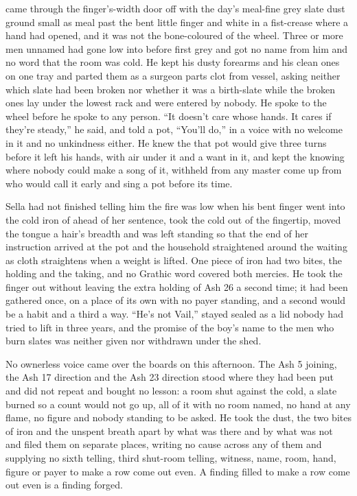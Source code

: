  came through the finger's-width door off  with the day's meal-fine grey slate dust ground small as meal past the bent little finger and white in a fist-crease where a hand had opened, and it was not the bone-coloured  of the wheel. Three or more men unnamed had gone low into  before first grey and got no name from him and no word that the room was cold. He kept his dusty forearms and his clean ones on one tray and parted them as a surgeon parts clot from vessel, asking neither which slate had been broken nor whether it was a birth-slate while the broken ones lay under the lowest rack and were entered by nobody. He spoke to the wheel before he spoke to any person. “It doesn't care whose hands. It cares if they're steady,” he said, and told a pot, “You'll do,” in a voice with no welcome in it and no unkindness either. He knew the  that pot would give three turns before it left his hands, with air under it and a want in it, and kept the knowing where nobody could make a song of it, withheld from any master come up from  who would call it early and sing a pot before its time.

Sella had not finished telling him the fire was low when his bent finger went into the cold iron of  ahead of her sentence, took the cold out of the fingertip, moved the tongue a hair's breadth and was left standing so that the end of her instruction arrived at the pot and the household straightened around the waiting as cloth straightens when a weight is lifted. One piece of iron had two bites, the holding and the taking, and no Grathic word covered both mercies. He took the finger out without leaving the extra holding of Ash 26 a second time; it had been gathered once, on a place of its own with no payer standing, and a second would be a habit and a third a way. “He's not Vail,” stayed sealed as a lid nobody had tried to lift in three years, and the promise of the boy's name to the men who burn slates was neither given nor withdrawn under the shed.

No ownerless voice came over the boards on this afternoon. The Ash 5 joining, the Ash 17 direction and the Ash 23 direction stood where they had been put and did not repeat and bought no lesson: a room shut against the cold, a slate burned so a count would not go up, all of it with no room named, no hand at any flame, no figure and nobody standing to be asked. He took the dust, the two bites of iron and the unspent breath apart by what was there and by what was not and filed them on separate places, writing no cause across any of them and supplying no sixth telling, third shut-room telling, witness, name, room, hand, figure or payer to make a row come out even. A finding filled to make a row come out even is a finding forged.

